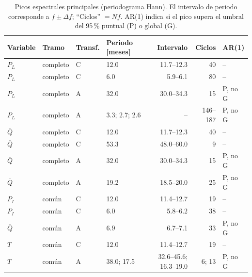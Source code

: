 \documentclass[11pt,letterpaper]{article}
\begin{document}
\begin{table}[H]
\centering\small
\caption{Picos espectrales principales (periodograma Hann). El intervalo de periodo corresponde a
$f\pm\Delta f$; ``Ciclos'' $=Nf$. AR(1) indica si el pico supera el umbral del 95\,\% puntual (P) o global (G).}
\label{tab:picos}
\begin{tabular}{llllrrl}
\toprule
Variable & Tramo & Transf. & Periodo [meses] & Intervalo & Ciclos & AR(1) \\
\midrule
$P_L$ & completo & C & 12.0 & 11.7--12.3 & 40 & -- \\
$P_L$ & completo & C & 6.0 & 5.9--6.1 & 80 & -- \\
$P_L$ & completo & A & 32.0 & 30.0--34.3 & 15 & P, no G \\
$P_L$ & completo & A & 3.3; 2.7; 2.6 & -- & 146--187 & P, no G \\
$\overline{Q}$ & completo & C & 12.0 & 11.7--12.3 & 40 & -- \\
$\overline{Q}$ & completo & C & 53.3 & 48.0--60.0 & 9 & -- \\
$\overline{Q}$ & completo & A & 32.0 & 30.0--34.3 & 15 & P, no G \\
$\overline{Q}$ & completo & A & 19.2 & 18.5--20.0 & 25 & P, no G \\
$P_I$ & común & C & 12.0 & 11.4--12.7 & 19 & -- \\
$P_I$ & común & C & 6.0 & 5.8--6.2 & 38 & -- \\
$\overline{Q}$ & común & A & 6.9 & 6.7--7.1 & 33 & P, no G \\
$T$ & común & C & 12.0 & 11.4--12.7 & 19 & -- \\
$T$ & común & A & 38.0; 17.5 & 32.6--45.6; 16.3--19.0 & 6; 13 & P, no G \\
\bottomrule
\end{tabular}
\end{table}
\end{document}
